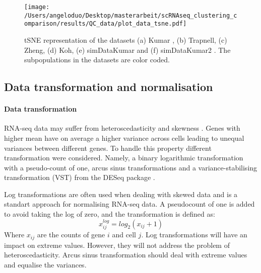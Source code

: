 \documentclass[12pt, a4paper]{article}\usepackage[]{graphicx}\usepackage[]{color}
\begin{document}
\begin{figure}[H]
\begin{center}
\texttt{[image: /Users/angeloduo/Desktop/masterarbeit/scRNAseq\_clustering\_comparison/results/QC\_data/plot\_data\_tsne.pdf]}
\caption{tSNE representation of the datasets (a) Kumar , (b) Trapnell, (c) Zheng, (d) Koh, (e) simDataKumar and (f) simDataKumar2 . The subpopulations in the datasets are color coded.  }
\label{fig:datatsne}
\end{center}
\end{figure}


\newpage
\subsection{Data transformation and normalisation}\label{ssec:norm}
\paragraph{Data transformation}
RNA-seq data may suffer from heteroscedasticity and skewness \citep{zwiener2014transforming}. Genes with higher mean have on average a higher variance across cells leading to unequal variances between different genes. 
To handle this property different transformation were considered. Namely, a binary logarithmic transformation with a pseudo-count of one, arcus sinus transformations and a variance-stabilising transformation (VST) from the DESeq package \citep{anders2010differential}. 

Log transformations are often used when dealing with skewed data and is a standart approach for normalising RNA-seq data. A pseudocount of one is added to avoid taking the log of zero, and the transformation is defined as:
\begin{equation}
x_{ij}^{log} = log_{2}(x_{ij} + 1)
\end{equation}
Where $x_{ij}$ are the counts of gene $i$ and cell $j$. Log transformations will have an impact on extreme values. However, they will not address the problem of heteroscedasticity. Arcus sinus transformation should deal with extreme values and equalise the variances. 
\end{document}

